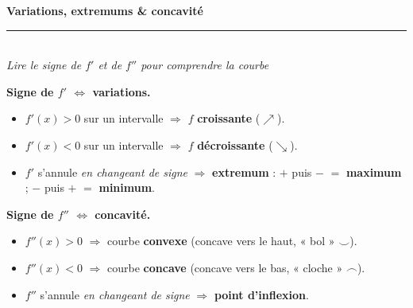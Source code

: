 \pagestyle{fancy}\fancyhf{}
\fancyfoot[C]{\small\thepage}
\renewcommand{\headrulewidth}{0.8pt}



\begin{center}
{\LARGE\bfseries\color{primarydark} Variations, extremums \& concavité}\\[2pt]
{\color{primary}\rule{0.5\textwidth}{1.2pt}}\\[4pt]
{\small\itshape Lire le signe de $f'$ et de $f''$ pour comprendre la courbe}
\end{center}
\vspace{2mm}

\begin{cle}
\textbf{Signe de $f'$ $\Longleftrightarrow$ variations.}
\begin{itemize}[leftmargin=6mm,itemsep=1pt]
  \item $f'(x)>0$ sur un intervalle $\Rightarrow$ $f$ \textbf{croissante} ($\nearrow$).
  \item $f'(x)<0$ sur un intervalle $\Rightarrow$ $f$ \textbf{décroissante} ($\searrow$).
  \item $f'$ s'annule \emph{en changeant de signe} $\Rightarrow$ \textbf{extremum} :
        $+$ puis $-$ $=$ \textbf{maximum} ; $-$ puis $+$ $=$ \textbf{minimum}.
\end{itemize}
\smallskip
\textbf{Signe de $f''$ $\Longleftrightarrow$ concavité.}
\begin{itemize}[leftmargin=6mm,itemsep=1pt]
  \item $f''(x)>0$ $\Rightarrow$ courbe \textbf{convexe} (concave vers le haut, « bol » $\smile$).
  \item $f''(x)<0$ $\Rightarrow$ courbe \textbf{concave} (concave vers le bas, « cloche » $\frown$).
  \item $f''$ s'annule \emph{en changeant de signe} $\Rightarrow$ \textbf{point d'inflexion}.
\end{itemize}
\end{cle}

